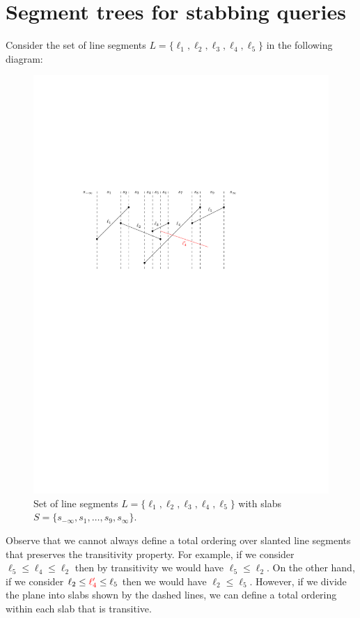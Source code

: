 \section{Segment trees for stabbing queries}
\label{sec:segmenet-trees}

Consider the set of line segments $L = \{ \ell_1, \ell_2, \ell_3, \ell_4, \ell_5\}$ in the following diagram: 

\begin{figure}[h!]
\centering
\includegraphics[scale = .8]{ipe/slanted-lines.pdf}
\caption{Set of line segments $L = \{ \ell_1, \ell_2, \ell_3, \ell_4, \ell_5\}$ with slabs $S = \{s_{-\infty},s_1, \dots, s_9, s_{\infty} \}$.}
\end{figure}
Observe that we cannot always define a total ordering over slanted line segments that preserves the transitivity property. 
%
For example, if we consider $\ell_5 \leq \ell_4 \leq \ell_2$ then by transitivity we would have $\ell_5 \leq \ell_2$. 
%
On the other hand, if we consider $\ell_2 \leq \textcolor{red}{\ell'_4} \leq \ell_5$ then we would have $\ell _2 \leq \ell_5$. 
%
However, if we divide the plane into slabs shown by the dashed lines, we can define a total ordering within each slab that is transitive. 

